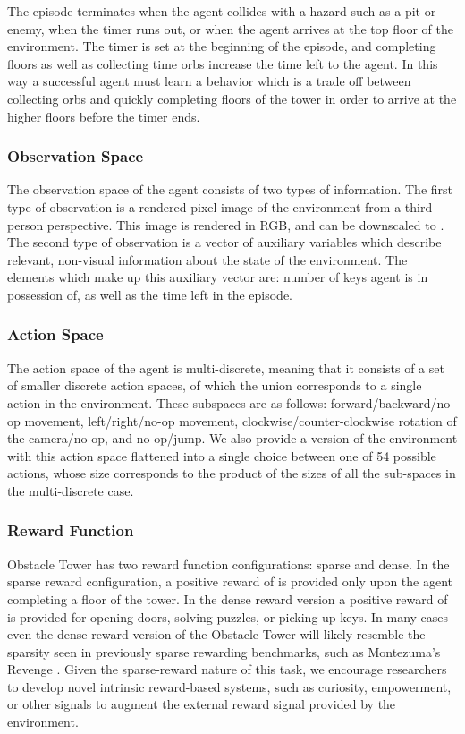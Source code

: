 \documentclass{article}
\begin{document}
The episode terminates when the agent collides with a hazard such as a pit or enemy, when the timer runs out, or when the agent arrives at the top floor of the environment. The timer is set at the beginning of the episode, and completing floors as well as collecting time orbs increase the time left to the agent. In this way a successful agent must learn a behavior which is a trade off between collecting orbs and quickly completing floors of the tower in order to arrive at the higher floors before the timer ends.

\subsubsection{Observation Space} The observation space of the agent consists of two types of information. The first type of observation is a rendered pixel image of the environment from a third person perspective. This image is rendered in  RGB, and can be downscaled to . The second type of observation is a vector of auxiliary variables which describe relevant, non-visual information about the state of the environment. The elements which make up this auxiliary vector are: number of keys agent is in possession of, as well as the time left in the episode.

\subsubsection{Action Space} The action space of the agent is multi-discrete, meaning that it consists of a set of smaller discrete action spaces, of which the union corresponds to a single action in the environment. These subspaces are as follows: forward/backward/no-op movement, left/right/no-op movement, clockwise/counter-clockwise rotation of the camera/no-op, and no-op/jump. We also provide a version of the environment with this action space flattened into a single choice between one of 54 possible actions, whose size corresponds to the product of the sizes of all the sub-spaces in the multi-discrete case.

\subsubsection{Reward Function} Obstacle Tower has two reward function configurations: sparse and dense. In the sparse reward configuration, a positive reward of  is provided only upon the agent completing a floor of the tower. In the dense reward version a positive reward of  is provided for opening doors, solving puzzles, or picking up keys. In many cases even the dense reward version of the Obstacle Tower will likely resemble the sparsity seen in previously sparse rewarding benchmarks, such as Montezuma's Revenge \cite{bellemare2013arcade}. Given the sparse-reward nature of this task, we encourage researchers to develop novel intrinsic reward-based systems, such as curiosity, empowerment, or other signals to augment the external reward signal provided by the environment. 
\end{document}

